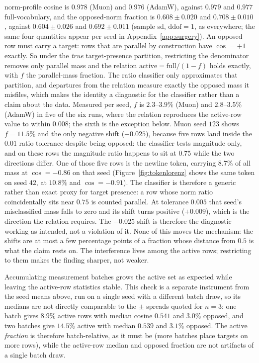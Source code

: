 norm-profile cosine is $0.978$ (Muon) and $0.976$ (AdamW), against $0.979$ and $0.977$
full-vocabulary, and the opposed-norm fraction is $0.608 \pm 0.020$ and
$0.708 \pm 0.010$, against $0.604 \pm 0.026$ and $0.692 \pm 0.011$ (sample sd,
$\mathrm{ddof}{=}1$, as everywhere; the same four quantities appear per seed in
Appendix~\ref{app:surgery}). An opposed row must carry a target: rows that are parallel
by construction have $\cos = +1$ exactly. So under the \emph{true} target-presence
partition, restricting the denominator removes only parallel mass and the relation
$\text{active} = \text{full}/(1-f)$ holds exactly, with $f$ the parallel-mass fraction.
The ratio classifier only approximates that partition, and departures from the relation
measure exactly the opposed mass it misfiles, which makes the identity a diagnostic for
the classifier rather than a claim about the data. Measured per seed, $f$ is
$2.3$--$3.9\%$ (Muon) and $2.8$--$3.5\%$ (AdamW) in five of the six runs, where the
relation reproduces the active-row value to within $0.008$; the sixth is the exception
below. Muon seed $123$ shows $f = 11.5\%$ and the only negative shift
(${-}0.025$), because five rows land inside the $0.01$ ratio tolerance despite being
opposed: the classifier tests magnitude only, and on these rows the magnitude ratio
happens to sit at $0.75$ while the two directions differ. One of those five rows is the
newline token, carrying $8.7\%$ of all mass at $\cos = -0.86$ on that seed
(Figure~\ref{fig:tokenlorenz} shows the same token on seed $42$, at $10.8\%$ and
$\cos = -0.91$). The classifier is therefore a generic rather than exact proxy for
target presence: a row whose norm ratio coincidentally sits near $0.75$ is counted
parallel. At tolerance $0.005$ that seed's misclassified mass falls to zero and its
shift turns positive (${+}0.009$), which is the direction the relation requires. The
$-0.025$ shift is therefore the diagnostic working as intended, not a violation of it.
None of this moves the mechanism: the shifts are at most a few percentage points of a fraction whose
distance from $0.5$ is what the claim rests on. The interference lives among the active rows;
restricting to them makes the finding sharper, not weaker.

Accumulating measurement batches grows the active set as expected while leaving the
active-row statistics stable. This check is a separate instrument from the seed means
above, run on a single seed with a different batch draw, so its medians are not
directly comparable to the ${\pm}$ spreads quoted for $n{=}3$: one batch gives
$8.9\%$ active rows with median cosine
$0.541$ and $3.0\%$ opposed, and two batches give $14.5\%$ active with median $0.539$
and $3.1\%$ opposed. The active \emph{fraction} is therefore batch-relative, as it
must be (more batches place targets on more rows), while the active-row median and
opposed fraction are not artifacts of a single batch draw.

